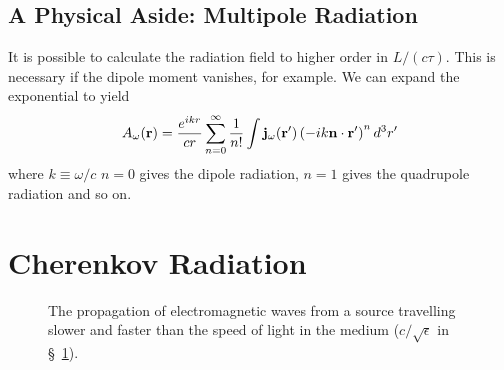 \subsection{A Physical Aside: Multipole Radiation}
\label{sec:phys-asid-mult}

It is possible to calculate the radiation field to higher order in
$L/(c\tau)$.  This is necessary if the dipole moment vanishes, for
example.   We can expand the exponential to yield
\begin{equation}
A_\omega ({\bf r}) = \frac{e^{ikr}}{cr} \sum_{n=0}^\infty \frac{1}{n!}
\int {\bf j}_\omega ({\bf r}') \left ( -ik{\bf n}\cdot {\bf r}' \right
)^n d^3 r'
\label{eq:233}
\end{equation}
where $k\equiv\omega/c$  $n=0$ gives the dipole radiation, $n=1$ gives
the quadrupole radiation and so on.

\section{Cherenkov Radiation}
\label{sec:cherenkov-radiation}

\newcommand{\waves}[1]{
  \fill (0,0) circle (0.02);
  \draw [->,thick] (-1.6*#1,0)--(0,0) ;
  \draw [dashed] (-1.6*#1,0)--(-1.6*#1,-2.4) 
                 (0,0) -- (0,-2)
                 (-1.6*#1+1.6,0) -- (-1.6*#1+1.6,-2.4);
  \draw [<-] (-1.6*#1,-2.3) -- (-1.6*#1+0.6,-2.3) ;
  \draw [->] (-1.6*#1+1.0,-2.3) -- (-1.6*#1+1.6,-2.3) ;
  \draw (-1.6*#1+0.8,-2.3) node {$ct$};
  \draw [<-] (-1.6*#1,-1.9) -- (-0.8*#1-0.2,-1.9) ;
  \draw [->] (-0.8*#1+0.2,-1.9) -- (0,-1.9) ;
  \draw (-0.8*#1,-1.9) node {$vt$};
   \foreach \t in {0.2,0.4,...,1.6} \draw (-\t*#1,0) circle (\t);
}
\begin{figure}
\begin{center}
\end{center}
\caption{The propagation of electromagnetic waves from a source
  travelling slower and faster than the speed of light in the medium
  ($c/\sqrt{\epsilon}$ in \S~\ref{sec:cherenkov-radiation}).}
\label{fig:cherenkov}
\end{figure}

